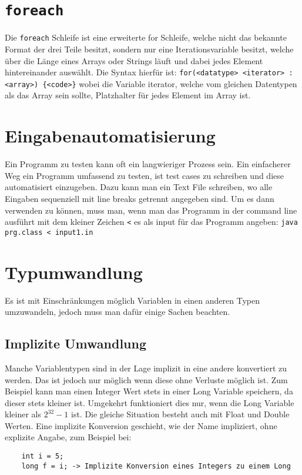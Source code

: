 \documentclass{article}
\begin{document}
	\section{\texorpdfstring{\texttt{foreach}}{foreach}}
	Die \verb|foreach| Schleife ist eine erweiterte for Schleife, welche nicht das bekannte Format der drei Teile besitzt, sondern nur eine Iterationsvariable besitzt, welche über die Länge eines Arrays oder Strings läuft und dabei jedes Element hintereinander auswählt. Die Syntax hierfür ist: \verb|for(<datatype> <iterator> : <array>) {<code>}| wobei die Variable iterator, welche vom gleichen Datentypen als das Array sein sollte, Platzhalter für jedes Element im Array ist.
	\section{Eingabenautomatisierung}
	Ein Programm zu testen kann oft ein langwieriger Prozess sein. Ein einfacherer Weg ein Programm umfassend zu testen, ist test cases zu schreiben und diese automatisiert einzugeben. Dazu kann man ein Text File schreiben, wo alle Eingaben sequenziell mit line breaks getrennt angegeben sind. Um es dann verwenden zu können, muss man, wenn man das Programm in der command line ausführt mit dem kleiner Zeichen \verb|<| es als input für das Programm angeben: \verb|java prg.class < input1.in| 
	\section{Typumwandlung}
	Es ist mit Einschränkungen möglich Variablen in einen anderen Typen umzuwandeln, jedoch muss man dafür einige Sachen beachten.
	\subsection{Implizite Umwandlung}
	Manche Variablentypen sind in der Lage implizit in eine andere konvertiert zu werden. Das ist jedoch nur möglich wenn diese ohne Verluste möglich ist. Zum Beispiel kann man einen Integer Wert stets in einer Long Variable speichern, da dieser stets kleiner ist. Umgekehrt funktioniert dies nur, wenn die Long Variable kleiner als $2^{32}-1$ ist. Die gleiche Situation besteht auch mit Float und Double Werten. Eine implizite Konversion geschieht, wie der Name impliziert, ohne explizite Angabe, zum Beispiel bei: \begin{verbatim}
	int i = 5;
	long f = i; -> Implizite Konversion eines Integers zu einem Long
	\end{verbatim}
\end{document}
